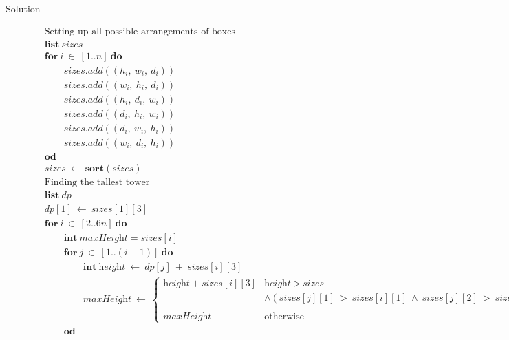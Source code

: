 \documentclass[a4paper]{article}
\begin{document}
\begin{enumerate}
\begin{description}
								\item[Solution]
										\begin{align*}
												&\text{Setting up all possible arrangements of boxes} \\
												&\textbf{list}\ \textit{sizes} \\
												&\textbf{for}\ i\ \in\ [1..n]\ \textbf{do} \\
												&\qquad\textit{sizes}.add((h_i,\ w_i,\ d_i)) \\
												&\qquad\textit{sizes}.add((w_i,\ h_i,\ d_i )) \\
												&\qquad\textit{sizes}.add((h_i,\ d_i,\ w_i)) \\
												&\qquad\textit{sizes}.add((d_i,\ h_i,\ w_i)) \\
												&\qquad\textit{sizes}.add((d_i,\ w_i,\ h_i)) \\
												&\qquad\textit{sizes}.add((w_i,\ d_i,\ h_i)) \\
												&\textbf{od} \\
												&\textit{sizes}\ \gets\ \textbf{sort}(\textit{sizes}) \\
												&\text{Finding the tallest tower}\\
												&\textbf{list}\ dp \\
												&dp[1]\ \gets\ \textit{sizes}[1][3] \\
												&\textbf{for}\ i\ \in\ [2..6n]\ \textbf{do} \\
												&\qquad\textbf{int}\ \textit{maxHeight} = \textit{sizes}[i]\\
												&\qquad\textbf{for}\ j\ \in\ [1..(i-1)]\ \textbf{do} \\
												&\qquad\qquad\textbf{int}\ \textit{height}\ \gets\ dp[j]\ +\ \textit{sizes}[i][3]\\
												&\qquad\qquad\textit{maxHeight}\ \gets\ 
												\begin{cases}
														\textit{height}+\textit{sizes}[i][3] & \textit{height$\ >\ $sizes}\ \\
														&\land (\textit{sizes$[j][1]\ >\ $sizes$[i][1]$}\ \land\ \textit{sizes$[j][2]\ >\ $sizes$[i][2]$}) \\
														& \\
														\textit{maxHeight} & \text{otherwise}
												\end{cases} \\
												&\qquad\textbf{od} \\

\end{align*}
\end{description}
\end{enumerate}
\end{document}
